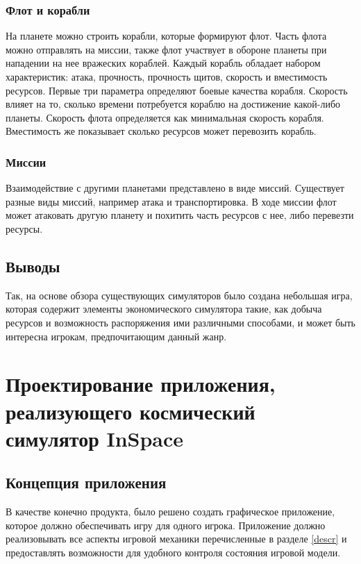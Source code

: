 \subsubsection{Флот и корабли}
На планете можно строить корабли, которые формируют флот. Часть флота можно отправлять на миссии, также флот участвует в обороне планеты при нападении на нее вражеских кораблей. Каждый корабль обладает набором характеристик: атака, прочность, прочность щитов, скорость и вместимость ресурсов. Первые три параметра определяют боевые качества корабля. Скорость влияет на то, сколько времени потребуется кораблю на достижение какой-либо планеты. Скорость флота определяется как минимальная скорость корабля. Вместимость же показывает сколько ресурсов может перевозить корабль.

\subsubsection{Миссии}
Взаимодействие с другими планетами представлено в виде миссий. Существует разные виды миссий, например атака и транспортировка. В ходе миссии флот может атаковать другую планету и похитить часть ресурсов с нее, либо перевезти ресурсы.


\subsection{Выводы}
Так, на основе обзора существующих симуляторов было создана небольшая игра, которая содержит элементы экономического симулятора такие, как добыча ресурсов и возможность распоряжения ими различными способами, и может быть интересна игрокам, предпочитающим данный жанр.


\section{Проектирование приложения, реализующего космический симулятор InSpace}

\subsection{Концепция приложения} 

В качестве конечно продукта, было решено создать графическое приложение, которое должно обеспечивать игру для одного игрока. Приложение должно реализовывать все аспекты игровой механики перечисленные в разделе \ref{descr} и предоставлять возможности для удобного контроля состояния игровой модели. 

